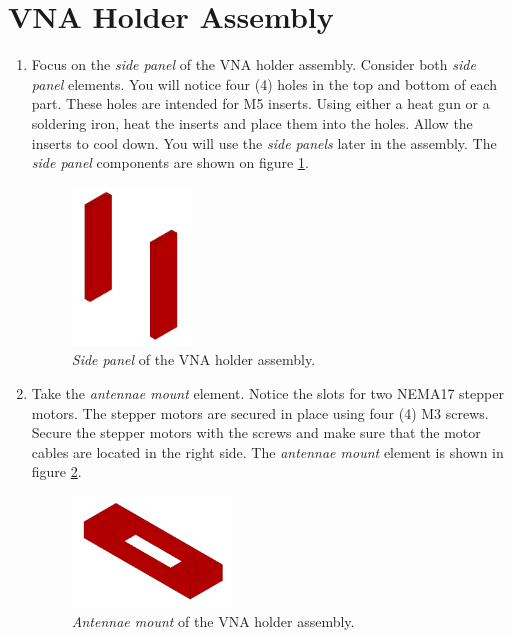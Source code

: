 \documentclass{article}
\begin{document}
\section{VNA Holder Assembly}
\begin{enumerate}
    \item Focus on the \textit{side panel} of the VNA holder assembly. Consider both \textit{side panel} elements. You will notice four (4) holes in the top and bottom of each part. These holes are intended for M5 inserts. Using either a heat gun or a soldering iron, heat the inserts and place them into the holes. Allow the inserts to cool down. You will use the \textit{side panels} later in the assembly. The \textit{side panel} components are shown on figure \ref{fig:vna_holder_1}.
    
    \begin{figure}[H]
        \centering
        \includegraphics[width=0.3\textwidth]{images/vna_holder/step_A.png}
        \caption{\textit{Side panel} of the VNA holder assembly.}
        \label{fig:vna_holder_1}
    \end{figure}
    
    \item Take the \textit{antennae mount} element. Notice the slots for two NEMA17 stepper motors. The stepper motors are secured in place using four (4) M3 screws. Secure the stepper motors with the screws and make sure that the motor cables are located in the right side. The \textit{antennae mount} element is shown in figure \ref{fig:vna_holder_2}.
    
    \begin{figure}[H]
        \centering
        \includegraphics[width=0.4\textwidth]{images/vna_holder/step_B.png}
        \caption{\textit{Antennae mount} of the VNA holder assembly.}
        \label{fig:vna_holder_2}
    \end{figure}
    

\end{enumerate}
\end{document}
